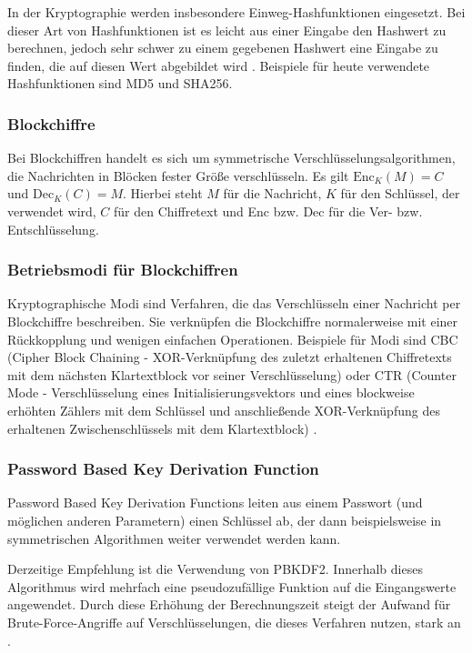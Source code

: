In der Kryptographie werden insbesondere Einweg-Hashfunktionen eingesetzt. Bei dieser Art von Hashfunktionen ist es leicht aus einer Eingabe den Hashwert zu berechnen, jedoch sehr schwer zu einem gegebenen Hashwert eine Eingabe zu finden, die auf diesen Wert abgebildet wird \cite{Schneier2006}. Beispiele für heute verwendete Hashfunktionen sind MD5 und SHA256.

\subsubsection*{Blockchiffre}
Bei Blockchiffren handelt es sich um symmetrische Verschlüsselungsalgorithmen, die Nachrichten in Blöcken fester Größe verschlüsseln. Es gilt \(\text{Enc}_K(M)=C\) und \(\text{Dec}_K(C)=M\). Hierbei steht \(M\) für die Nachricht, \(K\) für den Schlüssel, der verwendet wird, \(C\) für den Chiffretext und Enc bzw. Dec für die Ver- bzw. Entschlüsselung\cite{Schneier2006}.

\subsubsection*{Betriebsmodi für Blockchiffren}
Kryptographische Modi sind Verfahren, die das Verschlüsseln einer Nachricht per Blockchiffre beschreiben. Sie verknüpfen die Blockchiffre normalerweise mit einer Rückkopplung und wenigen einfachen Operationen. Beispiele für Modi sind CBC (Cipher Block Chaining - XOR-Verknüpfung des zuletzt erhaltenen Chiffretexts mit dem nächsten Klartextblock vor seiner Verschlüsselung) oder CTR (Counter Mode - Verschlüsselung eines Initialisierungsvektors und eines blockweise erhöhten Zählers mit dem Schlüssel und anschließende XOR-Verknüpfung des erhaltenen Zwischenschlüssels mit dem Klartextblock) \cite{Schneier2006}.

\subsubsection*{Password Based Key Derivation Function}
Password Based Key Derivation Functions leiten aus einem Passwort (und möglichen anderen Parametern) einen Schlüssel ab, der dann beispielsweise in symmetrischen Algorithmen weiter verwendet werden kann.

Derzeitige Empfehlung ist die Verwendung von PBKDF2. Innerhalb dieses Algorithmus wird mehrfach eine pseudozufällige Funktion auf die Eingangswerte angewendet. Durch diese Erhöhung der Berechnungszeit steigt der Aufwand für Brute-Force-Angriffe auf Verschlüsselungen, die dieses Verfahren nutzen, stark an  \cite{pbkdf2000}.

